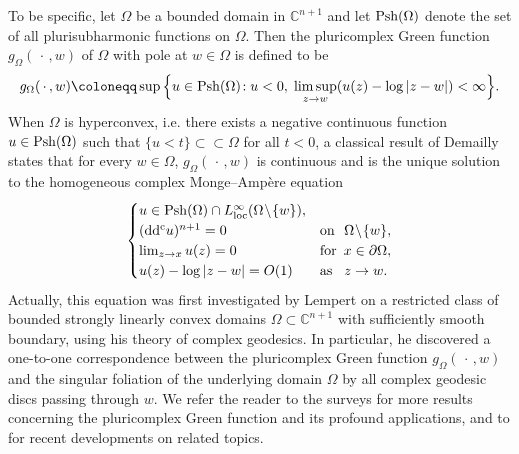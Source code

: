 \documentclass[12pt,a4paper]{amsart}
\numberwithin{equation}{section}
\theoremstyle{definition}
\newcommand{\ddc}{{\rm dd^c}}
\begin{document}
To be specific, let $\Omega$ be a bounded domain in $\mathbb C^{n+1}$ and let  ${\rm Psh}(\Omega)$ denote the set of all plurisubharmonic functions on $\Omega$. Then the pluricomplex Green function $g_{\Omega}(\,\cdot\,,w)$ of $\Omega$ with pole at $w\in\Omega$ is defined to be
\begin{equation*}\label{Greenkernel}
   g_{\Omega}(\,\cdot\,,w) \coloneqq \sup\Big\{u\in {\rm Psh}(\Omega)\!: u<0,
   \;\limsup\limits_{z\to w}(u(z)-\log|z-w|)<\infty \Big\}.
\end{equation*}
When $\Omega$ is hyperconvex, i.e. there exists a negative continuous function $u\in {\rm Psh}(\Omega)$ such that $\{u<t\}\subset\subset \Omega$ for all $t<0$, a classical result of Demailly \cite{Demailly87} states that for every $w\in\Omega$, $g_{\Omega}(\,\cdot\,,w)$ is continuous and is the unique solution to the homogeneous complex Monge--Amp\`{e}re equation
\begin{equation}\label{eq:Inter-MA}
  \begin{cases}
   u\in {\rm Psh}(\Omega)\cap
   L_{{\rm loc}}^{\infty}(\Omega\!\setminus\!\{w\}), \\
   (\ddc u)^{n+1}=0        &{\rm on}\,\,\ \Omega \!\setminus\! \{w\}, \\
   \lim_{z\to x}u(z)=0     &{\rm for}\,\  x\in\partial\Omega, \\
   u(z)-\log|z-w|=O(1)     &{\rm as} \, \ \ z\to w.\\
  \end{cases}
\end{equation}
Actually, this equation was first investigated by Lempert \cite{Lempert81, Lempert83, Lempert84} on a restricted class of bounded strongly linearly convex domains $\Omega\subset\mathbb C^{n+1}$ with sufficiently smooth boundary, using his theory of complex geodesics. In particular, he discovered a one-to-one correspondence between the pluricomplex Green function $g_{\Omega}(\,\cdot\,,w)$ and the singular foliation of the underlying domain $\Omega$ by all complex geodesic discs passing through $w$.
We refer the reader to the surveys \cite{Bracci_survey10, Blocki-survey14, Chen-Survey15} for more results concerning the pluricomplex Green function and its profound applications, and to \cite{Bracci-JEMS10, Chen-APDE17} for recent developments on related topics.

\end{document}
